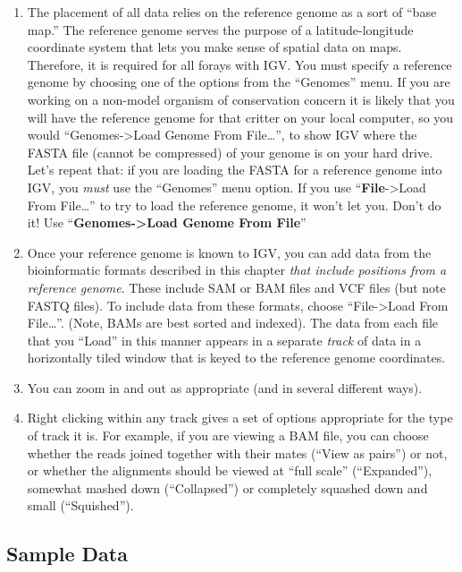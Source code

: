 \documentclass[]{krantz}
\begin{document}
\begin{enumerate}
\def\labelenumi{\arabic{enumi}.}
\item
  The placement of all data relies on the reference genome as a sort of ``base map.''
  The reference genome serves the purpose of a latitude-longitude coordinate system
  that lets you make sense of spatial data on maps. Therefore, it is required for
  all forays with IGV. You must specify a reference genome by choosing one of the
  options from the ``Genomes'' menu. If you are working on a non-model organism of
  conservation concern it is likely that you will have the reference genome for that
  critter on your local computer, so you would ``Genomes-\textgreater{}Load Genome From File\ldots{}'',
  to show IGV where the FASTA file (cannot be compressed) of your genome is on your
  hard drive. Let's repeat that: if you are loading the FASTA for a reference genome into IGV,
  you \emph{must} use the ``Genomes'' menu option. If you use ``\textbf{File}-\textgreater{}Load From File\ldots{}'' to try to
  load the reference genome, it won't let you. Don't do it! Use ``\textbf{Genomes-\textgreater{}Load Genome From File}''
\item
  Once your reference genome is known to IGV, you can add data from the
  bioinformatic formats described in this chapter \emph{that include positions from a reference genome}.
  These include SAM or BAM files and VCF files (but note FASTQ files). To include
  data from these formats, choose ``File-\textgreater{}Load From File\ldots{}''. (Note, BAMs are best
  sorted and indexed). The data from each file that you ``Load'' in this manner
  appears in a separate \emph{track} of data in a horizontally tiled window that is
  keyed to the reference genome coordinates.
\item
  You can zoom in and out as appropriate (and in several different ways).
\item
  Right clicking within any track gives a set of options appropriate for the type
  of track it is. For example, if you are viewing a BAM file, you can choose whether the reads
  joined together with their mates (``View as pairs'') or not, or whether the alignments
  should be viewed at ``full scale'' (``Expanded''), somewhat mashed down (``Collapsed'') or
  completely squashed down and small (``Squished'').
\end{enumerate}

\hypertarget{sample-data}{%
\subsection{Sample Data}\label{sample-data}}
\end{document}
